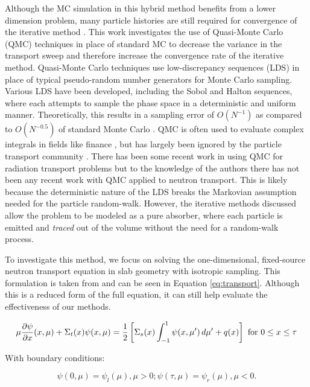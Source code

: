 Although the MC simulation in this hybrid method benefits from a lower dimension problem, many particle histories are still required for convergence of the iterative method \cite{ctk:jeff1}. This work investigates the use of Quasi-Monte Carlo (QMC) techniques in place of standard MC to decrease the variance in the transport sweep and therefore increase the convergence rate of the iterative method. Quasi-Monte Carlo techniques use low-discrepancy sequences (LDS) in place of typical pseudo-random number generators for Monte Carlo sampling. Various LDS have been developed, including the Sobol and Halton sequences, where each attempts to sample the phase space in a deterministic and uniform manner. Theoretically, this results in a sampling error of $O(N^{-1})$ as compared to $O(N^{-0.5})$  of standard Monte Carlo \cite{Bickel2009}. QMC is often used to evaluate complex integrals in fields like finance \cite{Dagpunar2007}, but has largely been ignored by the particle transport community \cite{Spanier1995}. There has been some recent work in using QMC for radiation transport problems \cite{Farmer2020, Palluotto2019} but  to the knowledge of the authors there has not been any recent work with QMC applied to neutron transport. This is likely because the deterministic nature of the LDS breaks the Markovian assumption needed for the particle random-walk. However, the iterative methods discussed allow the problem to be modeled as a pure absorber, where each particle is emitted and \textit{traced} out of the volume without the need for a random-walk process.

To investigate this method, we focus on solving the one-dimensional, fixed-source neutron transport equation in slab geometry with isotropic sampling. This formulation is taken from  \cite{ctk:jeff1} and can be seen in Equation \ref{eq:transport}. Although this is a reduced form of the full equation, it can still help evaluate the effectiveness of our methods. 

\begin{equation}\label{eq:transport}
\mu \frac{\partial \psi}{\partial x} (x,\mu) + \Sigma_t(x) \psi(x,\mu) =
\frac{1}{2} \left[ \Sigma_s(x) \int_{-1}^1 \psi(x, \mu') \, d\mu' + q(x) \right]
 \mbox{ for } 0 \le x \le \tau
\end{equation}

With boundary conditions:

\[
\psi(0, \mu) = \psi_l(\mu), \mu > 0; \psi(\tau, \mu) = \psi_r(\mu), \mu < 0.
\]

